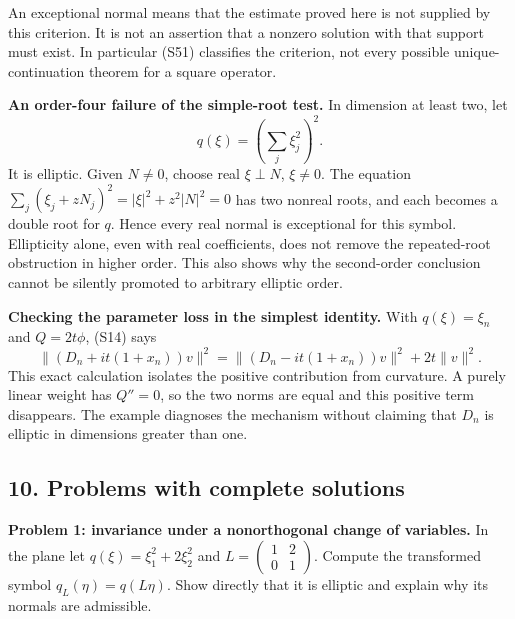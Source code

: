 \documentclass[
  11pt,
]{article}
\makeatletter
\let\ReaderOriginalAnchorStart\hyper@anchorstart
\let\ReaderOriginalAnchorEnd\hyper@anchorend
\let\ReaderPendingAliases\@empty
\def\ReaderArmAliases#1{\gdef\ReaderPendingAliases{#1}}
\def\hyper@anchorstart#1{\ReaderIfNativeAnchorTF{#1}{\ReaderPendingAliases\global\let\ReaderPendingAliases\@empty}{}\ReaderOriginalAnchorStart{#1}}
\makeatother
\begin{document}
An exceptional normal means that the estimate proved here is not
supplied by this criterion. It is not an assertion that a nonzero
solution with that support must exist. In particular (S51) classifies
the criterion, not every possible unique-continuation theorem for a
square operator.

\textbf{An order-four failure of the simple-root test.} In dimension at
least two, let \[
                         q(\xi)=\left(\sum_j\xi_j^2\right)^2.
\] It is elliptic. Given \(N\ne0\), choose real \(\xi\perp N\),
\(\xi\ne0\). The equation \(\sum_j(\xi_j+zN_j)^2=|\xi|^2+z^2|N|^2=0\)
has two nonreal roots, and each becomes a double root for \(q\). Hence
every real normal is exceptional for this symbol. Ellipticity alone,
even with real coefficients, does not remove the repeated-root
obstruction in higher order. This also shows why the second-order
conclusion cannot be silently promoted to arbitrary elliptic order.

\textbf{Checking the parameter loss in the simplest identity.} With
\(q(\xi)=\xi_n\) and \(Q=2t\phi\), (S14) says \[
 \|(D_n+it(1+x_n))v\|^2
       =\|(D_n-it(1+x_n))v\|^2+2t\|v\|^2.
\] This exact calculation isolates the positive contribution from
curvature. A purely linear weight has \(Q''=0\), so the two norms are
equal and this positive term disappears. The example diagnoses the
mechanism without claiming that \(D_n\) is elliptic in dimensions
greater than one.

\ReaderArmAliases{\ReaderOriginalAnchorStart{AN03-SUC-010}\ReaderOriginalAnchorEnd\begingroup\expandafter\def\csname @currentHref\endcsname{AN03-SUC-010}\label{AN03-SUC-010}\endgroup\ReaderOriginalAnchorStart{an03-suc-010-problems-with-complete-solutions}\ReaderOriginalAnchorEnd\begingroup\expandafter\def\csname @currentHref\endcsname{an03-suc-010-problems-with-complete-solutions}\label{an03-suc-010-problems-with-complete-solutions}\endgroup\ReaderOriginalAnchorStart{10-problems-with-complete-solutions}\ReaderOriginalAnchorEnd\begingroup\expandafter\def\csname @currentHref\endcsname{10-problems-with-complete-solutions}\label{10-problems-with-complete-solutions}\endgroup\ReaderOriginalAnchorStart{problems-with-complete-solutions}\ReaderOriginalAnchorEnd}
\subsection{10. Problems with complete
solutions}\label{problems-with-complete-solutions}

\textbf{Problem 1: invariance under a nonorthogonal change of
variables.} In the plane let \(q(\xi)=\xi_1^2+2\xi_2^2\) and
\(L=\begin{pmatrix}1&2\\0&1\end{pmatrix}\). Compute the transformed
symbol \(q_L(\eta)=q(L\eta)\). Show directly that it is elliptic and
explain why its normals are admissible.
\end{document}
